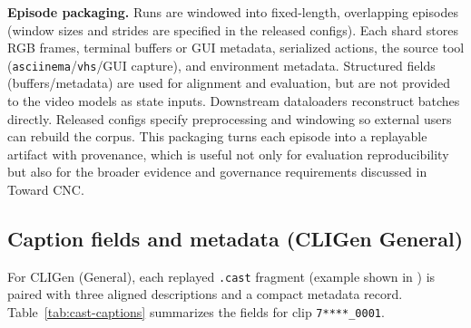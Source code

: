 \noindent\textbf{Episode packaging.}
Runs are windowed into fixed-length, overlapping episodes (window sizes and strides are specified in the released configs).
Each shard stores RGB frames, terminal buffers or GUI metadata, serialized actions, the source tool (\texttt{asciinema}/\texttt{vhs}/GUI capture), and environment metadata.
Structured fields (buffers/metadata) are used for alignment and evaluation, but are not provided to the video models as state inputs.
Downstream dataloaders reconstruct batches directly.
Released configs specify preprocessing and windowing so external users can rebuild the corpus.
This packaging turns each episode into a replayable artifact with provenance, which is useful not only for evaluation reproducibility but also for the broader evidence and governance requirements discussed in Toward CNC.

\subsection{Caption fields and metadata (CLIGen General)}
For CLIGen (General), each replayed \texttt{.cast} fragment (example shown in ) is paired with three aligned descriptions and a compact metadata record.
Table~\ref{tab:cast-captions} summarizes the fields for clip \texttt{7****\_0001}.

